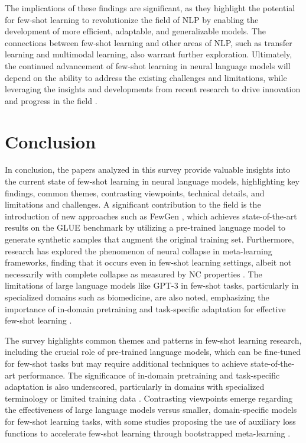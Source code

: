 \documentclass[conference]{IEEEtran}
\begin{document}
The implications of these findings are significant, as they highlight the potential for few-shot learning to revolutionize the field of NLP by enabling the development of more efficient, adaptable, and generalizable models. The connections between few-shot learning and other areas of NLP, such as transfer learning and multimodal learning, also warrant further exploration. Ultimately, the continued advancement of few-shot learning in neural language models will depend on the ability to address the existing challenges and limitations, while leveraging the insights and developments from recent research to drive innovation and progress in the field \cite{b6}.

\section{Conclusion}
In conclusion, the papers analyzed in this survey provide valuable insights into the current state of few-shot learning in neural language models, highlighting key findings, common themes, contrasting viewpoints, technical details, and limitations and challenges. A significant contribution to the field is the introduction of new approaches such as FewGen \cite{b1}, which achieves state-of-the-art results on the GLUE benchmark by utilizing a pre-trained language model to generate synthetic samples that augment the original training set. Furthermore, research has explored the phenomenon of neural collapse in meta-learning frameworks, finding that it occurs even in few-shot learning settings, albeit not necessarily with complete collapse as measured by NC properties \cite{b2}. The limitations of large language models like GPT-3 in few-shot tasks, particularly in specialized domains such as biomedicine, are also noted, emphasizing the importance of in-domain pretraining and task-specific adaptation for effective few-shot learning \cite{b3}.

The survey highlights common themes and patterns in few-shot learning research, including the crucial role of pre-trained language models, which can be fine-tuned for few-shot tasks but may require additional techniques to achieve state-of-the-art performance. The significance of in-domain pretraining and task-specific adaptation is also underscored, particularly in domains with specialized terminology or limited training data \cite{b4}. Contrasting viewpoints emerge regarding the effectiveness of large language models versus smaller, domain-specific models for few-shot learning tasks, with some studies proposing the use of auxiliary loss functions to accelerate few-shot learning through bootstrapped meta-learning \cite{b5}.
\end{document}
